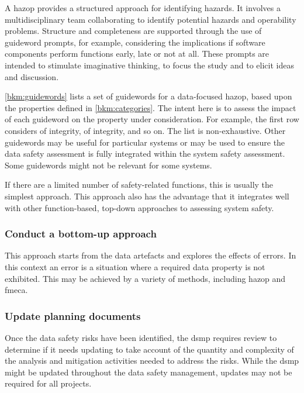 A \gls{hazop} \cite{citation:iec61882:2016}
provides a structured approach for identifying hazards. It involves a multidisciplinary team collaborating to identify potential hazards and operability problems. Structure and \gls{completeness} are supported through the use of guideword prompts, for example, considering the implications if software components perform functions early, late or not at all. These prompts are intended to stimulate imaginative thinking, to focus the study and to elicit ideas and discussion.

\autoref{bkm:guidewords} lists a set of guidewords for a data-focused \gls{hazop}, based upon the properties defined in \autoref{bkm:categories}. The intent here is to assess the impact of each guideword on the property under consideration. For example, the first row considers  of \gls{integrity},  of \gls{integrity}, and so on.
The list is non-exhaustive. Other guidewords may be useful for particular systems or may be used to ensure the \gls{data safety assessment} is fully integrated within the system safety assessment. Some guidewords might not be relevant for some systems.

If there are a limited number of safety-related functions, this is usually the simplest approach. This approach also has the advantage that it integrates well with other function-based, top-down approaches to assessing system safety. 

\subsubsection{Conduct a bottom-up approach}
This approach starts from the \glspl{data artefact} and explores the effects of \glspl{error}. In this context an error is a situation where a required \gls{data property} is not exhibited. This may be achieved by a variety of methods, including \gls{hazop} and \gls{fmeca}.

\subsubsection{Update planning documents}
Once the data safety risks have been identified, the \gls{dsmp} requires review to determine if it needs
updating to take account of the quantity and complexity of the analysis and \gls{mitigation} activities needed to address the risks. While the \gls{dsmp} might be updated throughout the \cbstart data safety management\cbend, updates may not be required for all projects.

